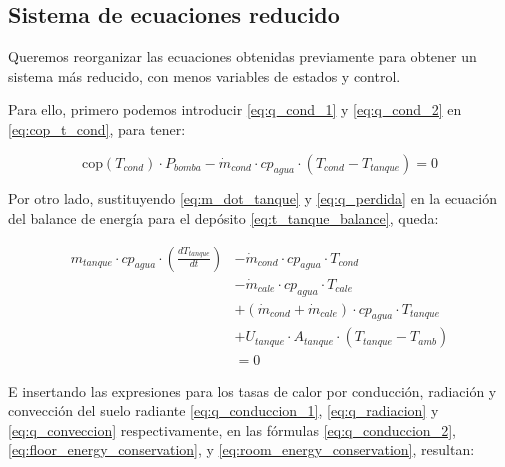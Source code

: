 \subsection{Sistema de ecuaciones reducido}

Queremos reorganizar las ecuaciones obtenidas previamente para obtener un
sistema más reducido, con menos variables de estados y control.

Para ello, primero podemos introducir \eqref{eq:q_cond_1} y \eqref{eq:q_cond_2}
en \eqref{eq:cop_t_cond}, para tener:

\begin{equation} \label{eq:sys_1}
	\text{cop}(T_{cond}) \cdot P_{bomba} - \dot{m}_{cond} \cdot cp_{agua} \cdot \left(T_{cond} - T_{tanque}\right) = 0
\end{equation}

Por otro lado, sustituyendo \eqref{eq:m_dot_tanque} y \eqref{eq:q_perdida} en
la ecuación del balance de energía para el depósito
\eqref{eq:t_tanque_balance}, queda:

\begin{align} \label{eq:sys_2}
	m_{tanque} \cdot cp_{agua} \cdot \left( \frac{dT_{tanque}}{dt} \right) & - \dot{m}_{cond} \cdot cp_{agua} \cdot T_{cond} \nonumber                      \\
	                                                                       & - \dot{m}_{cale} \cdot cp_{agua} \cdot T_{cale} \nonumber                      \\
	                                                                       & + (\dot{m}_{cond} + \dot{m}_{cale}) \cdot cp_{agua} \cdot T_{tanque} \nonumber \\
	                                                                       & + U_{tanque} \cdot A_{tanque} \cdot (T_{tanque} - T_{amb}) \nonumber           \\
	                                                                       & = 0
\end{align}


E insertando las expresiones para los tasas de calor por conducción, radiación
y convección del suelo radiante \eqref{eq:q_conduccion_1},
\eqref{eq:q_radiacion} y \eqref{eq:q_conveccion} respectivamente, en las
fórmulas \eqref{eq:q_conduccion_2}, \eqref{eq:floor_energy_conservation}, y
\eqref{eq:room_energy_conservation}, resultan:


